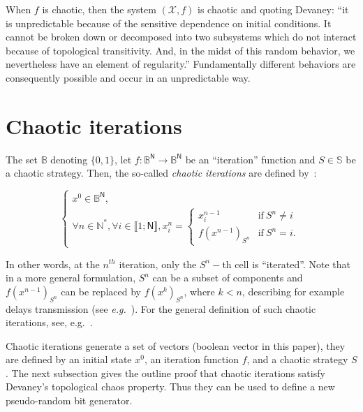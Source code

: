 When $f$ is chaotic, then the system $(\mathcal{X}, f)$ is chaotic and quoting Devaney: ``it is unpredictable because of the sensitive dependence on initial conditions. It cannot be broken down or decomposed into two subsystems which do not interact because of topological transitivity. And, in the midst of this random behavior, we nevertheless have an element of regularity.'' Fundamentally different  behaviors  are  consequently possible and occur in an unpredictable way.




\section{Chaotic iterations}
\label{subsection:Chaotic iterations}

\begin{definition}
\label{Chaotic iterations}
The set $\mathds{B}$ denoting $\{0,1\}$, let $f:\mathds{B}^{\mathsf{N}%
}\longrightarrow \mathds{B}^{\mathsf{N}}$ be an ``iteration'' function and $S\in \mathbb{S}
$ be a chaotic strategy. Then, the so-called \emph{chaotic iterations} are defined by~\cite{Robert1986}:

\begin{equation}
\left\{\begin{array}{l}
x^0\in \mathds{B}^{\mathsf{N}}, \\
\forall n\in \mathds{N}^{\ast },\forall i\in \llbracket1;\mathsf{N}\rrbracket%
,x_i^n=
\left\{
\begin{array}{ll}
x_i^{n-1} & \text{if}~S^n\neq i \\
f(x^{n-1})_{S^n}  & \text{if}~S^n=i.
\end{array} 
\right. 
\end{array}
\right.
\end{equation}
\end{definition}

In other words, at the $n^{th}$ iteration, only the $S^{n}-$th cell is
\textquotedblleft iterated\textquotedblright . Note that in a more general
formulation, $S^n$ can be a subset of components and $f(x^{n-1})_{S^{n}}$ can
be replaced by $f(x^{k})_{S^{n}}$, where $k < n$, describing for
example delays transmission (see \emph{e.g.}~\cite{Bahi2000}). For the
general definition of such chaotic iterations, see, e.g.~\cite{Robert1986}.

Chaotic iterations generate a set of vectors (boolean vector in this paper),
they are defined by an initial state $x^{0}$, an iteration function $f$, and a chaotic strategy $S$.
The next subsection gives the outline proof that chaotic iterations satisfy Devaney's topological chaos property. Thus they can be used to define a new pseudo-random bit generator.


